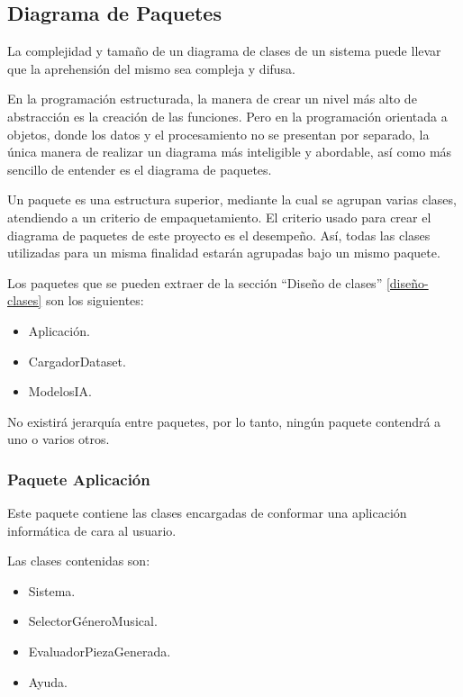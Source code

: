 
\subsection{Diagrama de Paquetes}

La complejidad y tamaño de un diagrama de clases de un sistema puede llevar que la aprehensión del mismo sea compleja y difusa.

En la programación estructurada, la manera de crear un nivel más alto de abstracción es la creación de las funciones. Pero en la programación orientada a objetos, donde los datos y el procesamiento no se presentan por separado, la única manera de realizar un diagrama más inteligible y abordable, así como más sencillo de entender es el diagrama de paquetes.

Un paquete es una estructura superior, mediante la cual se agrupan varias clases, atendiendo a un criterio de empaquetamiento. El criterio usado para crear el diagrama de paquetes de este proyecto es el desempeño. Así, todas las clases utilizadas para un misma finalidad estarán agrupadas bajo un mismo paquete.

Los paquetes que se pueden extraer de la sección ``Diseño de clases'' \ref{diseño-clases} son los siguientes:

\begin{itemize}
    \item Aplicación.
    \item CargadorDataset.
    \item ModelosIA.
\end{itemize}

No existirá jerarquía entre paquetes, por lo tanto, ningún paquete contendrá a uno o varios otros.

\subsubsection{Paquete Aplicación}
Este paquete contiene las clases encargadas de conformar una aplicación informática de cara al usuario. 

Las clases contenidas son:

\begin{itemize}
  \item Sistema.
  \item SelectorGéneroMusical.
  \item EvaluadorPiezaGenerada.
  \item Ayuda.
\end{itemize}

